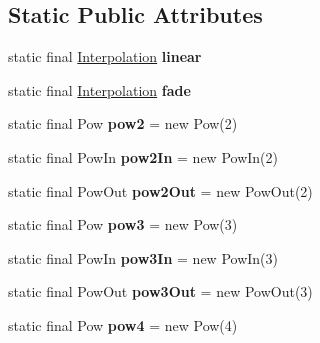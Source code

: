 \subsection*{Static Public Attributes}
\begin{DoxyCompactItemize}
\item 
static final \hyperlink{classairhockeyjava_1_1util_1_1_interpolation}{Interpolation} {\bfseries linear}
\item 
static final \hyperlink{classairhockeyjava_1_1util_1_1_interpolation}{Interpolation} {\bfseries fade}
\item 
\hypertarget{classairhockeyjava_1_1util_1_1_interpolation_a493b58af047db6cc747522bccc1616a4}{}static final Pow {\bfseries pow2} = new Pow(2)\label{classairhockeyjava_1_1util_1_1_interpolation_a493b58af047db6cc747522bccc1616a4}

\item 
\hypertarget{classairhockeyjava_1_1util_1_1_interpolation_a34476fb3e023ea579b9be4e0568b6fbe}{}static final Pow\+In {\bfseries pow2\+In} = new Pow\+In(2)\label{classairhockeyjava_1_1util_1_1_interpolation_a34476fb3e023ea579b9be4e0568b6fbe}

\item 
\hypertarget{classairhockeyjava_1_1util_1_1_interpolation_ac4eb3ce6d1db7edc30e69a3013634498}{}static final Pow\+Out {\bfseries pow2\+Out} = new Pow\+Out(2)\label{classairhockeyjava_1_1util_1_1_interpolation_ac4eb3ce6d1db7edc30e69a3013634498}

\item 
\hypertarget{classairhockeyjava_1_1util_1_1_interpolation_aa5d7249679e28393606194a10af4eca1}{}static final Pow {\bfseries pow3} = new Pow(3)\label{classairhockeyjava_1_1util_1_1_interpolation_aa5d7249679e28393606194a10af4eca1}

\item 
\hypertarget{classairhockeyjava_1_1util_1_1_interpolation_a9301278b849389860fe8a2d832f9a6d2}{}static final Pow\+In {\bfseries pow3\+In} = new Pow\+In(3)\label{classairhockeyjava_1_1util_1_1_interpolation_a9301278b849389860fe8a2d832f9a6d2}

\item 
\hypertarget{classairhockeyjava_1_1util_1_1_interpolation_a0ad6b26e4290932bbcb88f2d0583f2ac}{}static final Pow\+Out {\bfseries pow3\+Out} = new Pow\+Out(3)\label{classairhockeyjava_1_1util_1_1_interpolation_a0ad6b26e4290932bbcb88f2d0583f2ac}

\item 
\hypertarget{classairhockeyjava_1_1util_1_1_interpolation_acb0f2d07fd0f04a347ecade0421dd024}{}static final Pow {\bfseries pow4} = new Pow(4)\label{classairhockeyjava_1_1util_1_1_interpolation_acb0f2d07fd0f04a347ecade0421dd024}


\end{DoxyCompactItemize}
